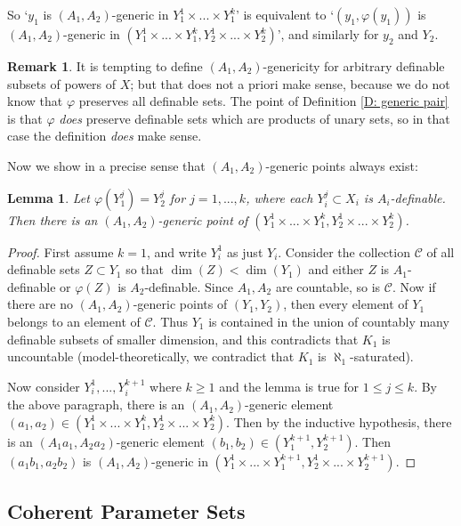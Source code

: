 \documentclass{amsart}
\newtheorem{lemma}[theorem]{Lemma}
\theoremstyle{definition}
\newtheorem{remark}[theorem]{Remark}
\begin{document}
So `$y_1$ is $(A_1,A_2)$-generic in $Y_1^1\times...\times Y_1^k$' is equivalent to `$(y_1,\varphi(y_1))$ is $(A_1,A_2)$-generic in $(Y_1^1\times...\times Y_1^k,Y_2^1\times...\times Y_2^k)$', and similarly for $y_2$ and $Y_2$. 

\begin{remark} It is tempting to define $(A_1,A_2)$-genericity for arbitrary definable subsets of powers of $X$; but that does not a priori make sense, because we do not know that $\varphi$ preserves all definable sets. The point of Definition \ref{D: generic pair} is that $\varphi$ \textit{does} preserve definable sets which are products of unary sets, so in that case the definition \textit{does} make sense.
\end{remark}

Now we show in a precise sense that $(A_1,A_2)$-generic points always exist:

\begin{lemma}\label{L: generics exist}
    Let $\varphi(Y_1^j)=Y_2^j$ for $j=1,...,k$, where each $Y_i^j\subset X_i$ is $A_i$-definable. Then there is an $(A_1,A_2)$-generic point of $(Y_1^1\times...\times Y_1^k,Y_2^1\times...\times Y_2^k)$.
\end{lemma}
\begin{proof}
    First assume $k=1$, and write $Y_i^1$ as just $Y_i$. Consider the collection $\mathcal C$ of all definable sets $Z\subset Y_1$ so that $\dim(Z)<\dim(Y_1)$ and either $Z$ is $A_1$-definable or $\varphi(Z)$ is $A_2$-definable. Since $A_1,A_2$ are countable, so is $\mathcal C$. Now if there are no $(A_1,A_2)$-generic points of $(Y_1,Y_2)$, then every element of $Y_1$ belongs to an element of $\mathcal C$. Thus $Y_1$ is contained in the union of countably many definable subsets of smaller dimension, and this contradicts that $K_1$ is uncountable (model-theoretically, we contradict that $K_1$ is $\aleph_1$-saturated). 

    Now consider $Y_i^1,...,Y_i^{k+1}$ where $k\geq 1$ and the lemma is true for $1\leq j\leq k$. By the above paragraph, there is an $(A_1,A_2)$-generic element $(a_1,a_2)\in(Y_1^1\times...\times Y_1^k,Y_2^1\times...\times Y_2^k)$. Then by the inductive hypothesis, there is an $(A_1a_1,A_2a_2)$-generic element $(b_1,b_2)\in (Y_1^{k+1},Y_2^{k+1})$. Then $(a_1b_1,a_2b_2)$ is $(A_1,A_2)$-generic in $(Y_1^1\times...\times Y_1^{k+1},Y_2^1\times...\times Y_2^{k+1})$.
\end{proof}

\subsection{Coherent Parameter Sets}
\end{document}
